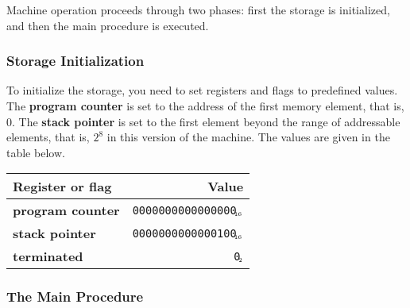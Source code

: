 \documentclass[a4paper,12pt]{article}
\newcommand{\num}[1]{\texttt{#1}\xspace}
\newcommand{\hex}[1]{\num{#1}$_{\textup{\tiny\hskip-1ex 16}}$\xspace}
\newcommand{\bin}[1]{\num{#1}$_{\textup{\tiny\hskip-1ex 2}}$\xspace}
\newcommand{\PC}{\textbf{program counter}\xspace}
\newcommand{\SP}{\textbf{stack pointer}\xspace}
\newcommand{\TERM}{\textbf{terminated}\xspace}
\newcommand{\F}{\bin{0}}
\begin{document}
Machine operation proceeds through two phases: first the storage is initialized, and then the main procedure is executed.

\subsubsection{Storage Initialization}

To initialize the storage, you need to set registers and flags to predefined values.
The \PC is set to the address of the first memory element, that is, $0$.
The \SP is set to the first element beyond the range of addressable elements, that is, $2^{8}$ in this version of the machine.
The values are given in the table below.

\begin{center}
  \begin{tabular}{@{}lr@{}}
    \hline
    Register or flag & Value                   \\
    \hline
    \PC              & \hex{0000000000000000}  \\
    \SP              & \hex{0000000000000100}  \\
    \TERM            & \F                      \\
    \hline
  \end{tabular}
\end{center}

\subsubsection{The Main Procedure}
\end{document}
